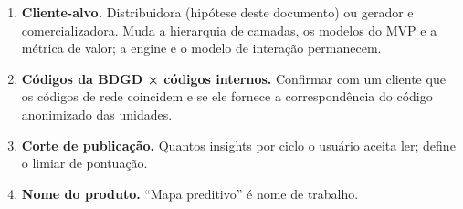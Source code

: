\documentclass[10pt,a4paper,oneside]{article}
\begin{document}
\begin{enumerate}
  \item \textbf{Cliente-alvo.} Distribuidora (hipótese deste documento) ou
    gerador e comercializadora. Muda a hierarquia de camadas, os modelos do
    MVP e a métrica de valor; a engine e o modelo de interação permanecem.
  \item \textbf{Códigos da BDGD × códigos internos.} Confirmar com um cliente
    que os códigos de rede coincidem e se ele fornece a correspondência do
    código anonimizado das unidades.
  \item \textbf{Corte de publicação.} Quantos insights por ciclo o usuário
    aceita ler; define o limiar de pontuação.
  \item \textbf{Nome do produto.} ``Mapa preditivo'' é nome de trabalho.
\end{enumerate}
\end{document}
